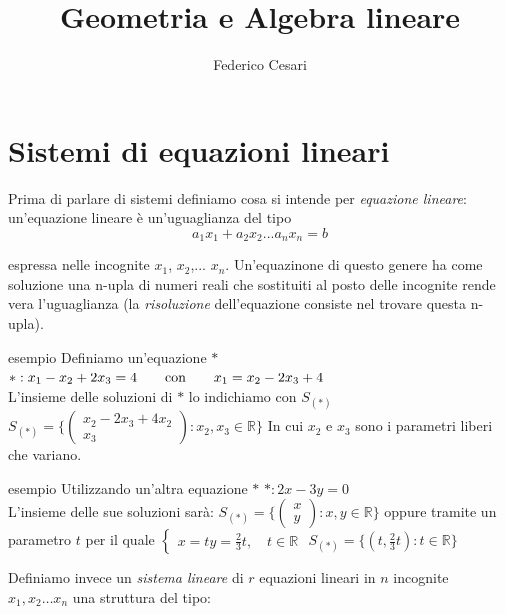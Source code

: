\documentclass[x11names]{article}
\title{Geometria e Algebra lineare}
\author{Federico Cesari}
\date{}
\begin{document}

\tableofcontents
\newpage








\newpage
\section{Sistemi di equazioni lineari}
 Prima di parlare di sistemi definiamo cosa si intende per \textit{equazione lineare}: un'equazione lineare è un'uguaglianza del tipo  
 $$a_{1}x_{1} + a_{2}x_{2}... a_nx_n=b$$ 

 espressa nelle incognite $x_1$, $x_2$,... $x_n$. Un'equazinone di questo genere ha come soluzione una n-upla di numeri reali che sostituiti al posto delle incognite rende vera l'uguaglianza (la \textit{risoluzione} dell'equazione consiste nel trovare questa n-upla).

 \begin{es}{esempio}
     Definiamo un'equazione $*$ 
     $*:x_1 - x_2 + 2x_3 = 4 \qquad \textnormal{con} \qquad x_1 = x_2 - 2x_3 + 4$  \\
     L'insieme delle soluzioni di $*$ lo indichiamo con $S_{(*)}$ 
      $S_{(*)} = \Biggl\{\begin{pmatrix}x_2 - 2x_3 + 4 x_2 \\ x_3 \end{pmatrix}: x_2, x_3 \in \mathbb{R}\Biggl\} $ 
      In cui $x_2$ e $x_3$ sono i parametri liberi che variano.
 \end{es}

 \begin{es}{esempio}
     Utilizzando un'altra equazione $*$ 
     $*: 2x - 3y = 0$  \\
     L'insieme delle sue soluzioni sarà: 
     $S_{(*)} = \Biggl\{\begin{pmatrix}x \\ y \end{pmatrix}: x,y \in \mathbb{R}\Biggl\} $ 
     oppure tramite un parametro $t$ per il quale $\begin{cases}x=ty=\frac{2}{3}t ,\quad t \in \mathbb{R}\end{cases}$ 
      $S_{(*)} = \biggl\{(t,\frac{2}{3}t): t \in \mathbb{R}\biggl\} $
 \end{es}

 \vspace{2em}
 Definiamo invece un \textit{sistema lineare} di $r$ equazioni lineari in $n$ incognite $x_1, x_2 \dots x_n$ una struttura del tipo:
\end{document}
